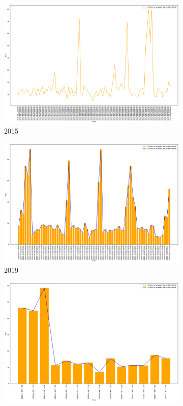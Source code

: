 \begin{figure}[h]
	\centering
	\caption{Daily difference of max and min FFMC values}
	\begin{subfigure}{0.45\textwidth}
		\centering
		\includegraphics[width=\textwidth]{graphs/2015/byHour/FFMC_DIFFmaxMin.png}
		\caption{2015}
	\end{subfigure}
	\hfill
	\begin{subfigure}{0.45\textwidth}
		\centering
		\includegraphics[width=\textwidth]{graphs/2019/byHour/FFMC_DIFFmaxMin.png}
		\caption{2019}
	\end{subfigure}
	\hfill
	\begin{subfigure}{0.45\textwidth}
		\centering
		\includegraphics[width=\textwidth]{graphs/2022/FFMC_DIFFmaxMin.png}

\end{subfigure}
\end{figure}

